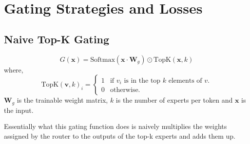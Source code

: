 \documentclass[12pt]{article}
\begin{document}
\section{Gating Strategies and Losses} \label{gating}

\subsection{Naive Top-K Gating}
\begin{equation}
G(\mathbf{x}) = \text{Softmax}(\mathbf{x\cdot W}_g)\odot \text{TopK}(\mathbf{x},k)
\end{equation}
where,
\begin{equation}
\text{TopK}(\mathbf{v}, k)_i = 
\begin{cases} 
1 & \text{if } v_i \text{ is in the top } k \text{ elements of } v. \\
0 & \text{otherwise}.
\end{cases}
\end{equation}
$\mathbf{W}_g$ is the trainable weight matrix, $k$ is the number of experts per token and  $\mathbf{x}$ is the input.

Essentially what this gating function does is naively multiplies the weights assigned by the router to the outputs of the top-k experts and adds them up. 
\end{document}
